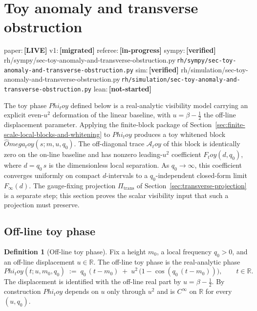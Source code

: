 \documentclass[11pt,a4paper]{amsart}
\def\Omega{Omega}%
\def\Phi{Phi}%
\def\toy{toy}%
\numberwithin{equation}{section}
\theoremstyle{plain}
\theoremstyle{definition}
\newtheorem{definition}[theorem]{Definition}
\newcommand{\Om}{\Omega}
\newcommand{\Ph}{\Phi}
\newcommand{\toy}{\mathrm{toy}}
\newcommand{\trans}{\mathrm{trans}}
\newcommand{\status}[1]{\textbf{\scriptsize[#1]}}
\newcommand{\statuspaper}[1]{\textsf{\footnotesize paper:}\,\status{#1}}
\newcommand{\statusmig}[1]{\textsf{\footnotesize v1:}\,\status{#1}}
\newcommand{\statusreferee}[1]{\textsf{\footnotesize referee:}\,\status{#1}}
\newcommand{\statussympy}[2][\relax]{%
  \textsf{\footnotesize sympy:}\,\status{#2}%
  \ifx\relax#1\else\,\textsf{\scriptsize\texttt{#1}}\fi%
}
\newcommand{\statussim}[2][\relax]{%
  \textsf{\footnotesize sim:}\,\status{#2}%
  \ifx\relax#1\else\,\textsf{\scriptsize\texttt{#1}}\fi%
}
\newcommand{\statuslean}[2][\relax]{%
  \textsf{\footnotesize lean:}\,\status{#2}%
  \ifx\relax#1\else\,\textsf{\scriptsize\texttt{#1}}\fi%
}
\begin{document}
\section{Toy anomaly and transverse obstruction}
\label{sec:toy-anomaly-and-transverse-obstruction}
\statuspaper{LIVE}\quad
\statusmig{migrated}\quad
\statusreferee{in-progress}\quad
\statussympy[rh/sympy/sec-toy-anomaly-and-transverse-obstruction.py]{verified}\quad
\statussim[rh/simulation/sec-toy-anomaly-and-transverse-obstruction.py]{verified}\quad
\statuslean{not-started}
\par\medskip

The toy phase \(\Ph_\toy\) defined below is a real-analytic visibility
model carrying an explicit even-\(u^2\) deformation of the linear
baseline, with \(u=\beta-\tfrac12\) the off-line displacement parameter.
Applying the finite-block package of
Section~\ref{sec:finite-scale-local-blocks-and-whitening} to
\(\Ph_\toy\) produces a toy whitened block
\(\widehat\Om_\toy(s;m,u,q_0)\).  The off-diagonal trace
\(\mathcal A_\toy\) of this block is identically zero on the on-line
baseline and has nonzero leading-\(u^2\) coefficient
\(F_\toy(d,q_0)\), where \(d=q_0\,s\) is the dimensionless local
separation.  As \(q_0\to\infty\), this coefficient converges uniformly
on compact \(d\)-intervals to a \(q_0\)-independent closed-form limit
\(F_{\infty}(d)\).  The gauge-fixing projection
\(\Pi_\trans\) of Section~\ref{sec:transverse-projection} is a separate
step; this section proves the scalar visibility input that such a
projection must preserve.

\subsection{Off-line toy phase}
\label{subsec:off-line-toy-phase}

\begin{definition}[Off-line toy phase]
\label{def:off-line-toy-phase}
Fix a height \(m_0\), a local frequency \(q_0>0\), and an off-line
displacement \(u\in\mathbb R\).  The off-line toy phase is the
real-analytic phase
\begin{equation}
\label{eq:toy-phase}
\Ph_\toy(t;u,m_0,q_0)
\;:=\;q_0\,(t-m_0)\;+\;u^2\,\bigl(1-\cos(q_0\,(t-m_0))\bigr),
\qquad t\in\mathbb R.
\end{equation}
The displacement is identified with the off-line real part by
\(u=\beta-\tfrac12\).  By construction \(\Ph_\toy\) depends on \(u\)
only through \(u^2\) and is \(C^\infty\) on \(\mathbb R\) for every
\((u,q_0)\).
\end{definition}
\end{document}
